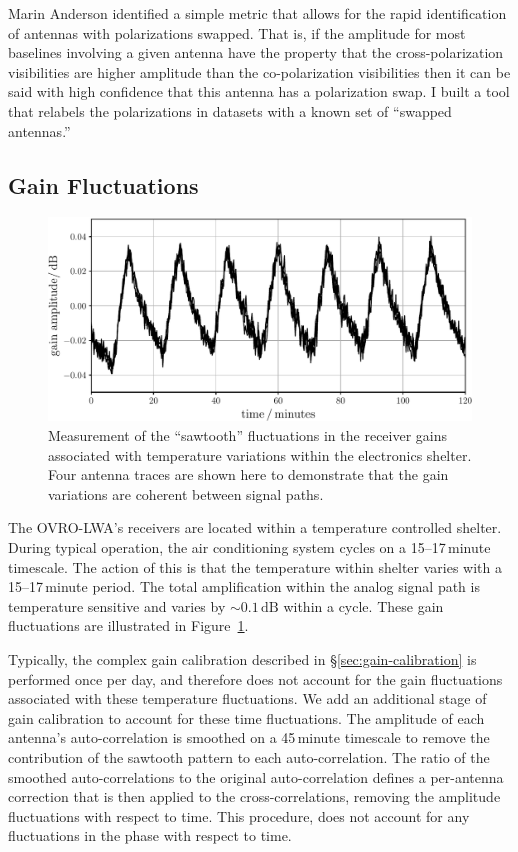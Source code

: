 \begin{bibunit}
Marin Anderson identified a simple metric that allows for the rapid identification of antennas with
polarizations swapped. That is, if the amplitude for most baselines involving a given antenna have
the property that the cross-polarization visibilities are higher amplitude than the co-polarization
visibilities then it can be said with high confidence that this antenna has a polarization swap. I
built a tool that relabels the polarizations in datasets with a known set of ``swapped antennas.''

\subsection{Gain Fluctuations}

\begin{figure}
    \centering
    \includegraphics[width=\textwidth]{figures/chapter2/sawtooth/sawtooth}
    \caption{
        Measurement of the ``sawtooth'' fluctuations in the receiver gains associated with
        temperature variations within the electronics shelter. Four antenna traces are shown here to
        demonstrate that the gain variations are coherent between signal paths.
    }
    \label{fig:sawtooth-gains}
\end{figure}

The OVRO-LWA's receivers are located within a temperature controlled shelter. During typical
operation, the air conditioning system cycles on a 15--17\,minute timescale. The action of this is
that the temperature within shelter varies with a 15--17\,minute period. The total amplification
within the analog signal path is temperature sensitive and varies by $\sim 0.1\,\text{dB}$ within a
cycle. These gain fluctuations are illustrated in Figure~\ref{fig:sawtooth-gains}.

Typically, the complex gain calibration described in \S\ref{sec:gain-calibration} is performed once
per day, and therefore does not account for the gain fluctuations associated with these temperature
fluctuations. We add an additional stage of gain calibration to account for these time fluctuations.
The amplitude of each antenna's auto-correlation is smoothed on a 45\,minute timescale to remove the
contribution of the sawtooth pattern to each auto-correlation. The ratio of the smoothed
auto-correlations to the original auto-correlation defines a per-antenna correction that is then
applied to the cross-correlations, removing the amplitude fluctuations with respect to time. This
procedure, does not account for any fluctuations in the phase with respect to time.


\end{bibunit}
